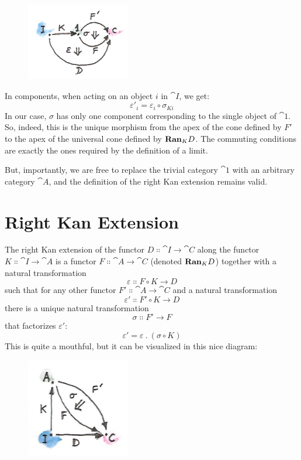 \begin{figure}[H]
  \centering
  \includegraphics[width=0.4\textwidth]{images/kan5.jpg}
\end{figure}

\noindent
In components, when acting on an object $i$ in $\cat{I}$, we get:
\[\varepsilon'_i = \varepsilon_i \circ \sigma_{K i}\]
In our case, $\sigma$ has only one component corresponding to the
single object of $\cat{1}$. So, indeed, this is the unique morphism
from the apex of the cone defined by $F'$ to the apex of
the universal cone defined by $\mathbf{Ran}_{K}D$. The commuting conditions
are exactly the ones required by the definition of a limit.

But, importantly, we are free to replace the trivial category $\cat{1}$
with an arbitrary category $\cat{A}$, and the definition of the right Kan
extension remains valid.

\section{Right Kan Extension}

The right Kan extension of the functor $D \Colon \cat{I} \to \cat{C}$
along the functor $K \Colon \cat{I} \to \cat{A}$ is a functor
$F \Colon \cat{A} \to \cat{C}$ (denoted $\mathbf{Ran}_{K}D$) together with a
natural transformation
\[\varepsilon \Colon F \circ K \to D\]
such that for any other functor $F' \Colon \cat{A} \to \cat{C}$ and
a natural transformation
\[\varepsilon' \Colon F' \circ K \to D\]
there is a unique natural transformation
\[\sigma \Colon F' \to F\]
that factorizes $\varepsilon'$:
\[\varepsilon' = \varepsilon\ .\ (\sigma \circ K)\]
This is quite a mouthful, but it can be visualized in this nice diagram:

\begin{figure}[H]
  \centering
  \includegraphics[width=0.4\textwidth]{images/kan7.jpg}
\end{figure}

